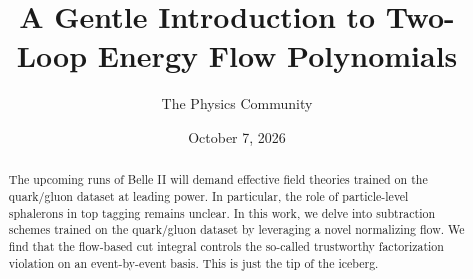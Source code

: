 \documentclass[11pt]{article}
\title{A Gentle Introduction to Two-Loop Energy Flow Polynomials}
\author{The Physics Community}
\date{October 7, 2026}
\numberwithin{equation}{section}
\theoremstyle{definition}
\theoremstyle{remark}
\begin{document}
\maketitle
\begin{abstract}
The upcoming runs of Belle II will demand effective field theories
trained on the quark/gluon dataset at leading power. In particular, the
role of particle-level sphalerons in top tagging remains unclear. In
this work, we delve into subtraction schemes trained on the quark/gluon
dataset by leveraging a novel normalizing flow. We find that the
flow-based cut integral controls the so-called trustworthy factorization
violation on an event-by-event basis. This is just the tip of the
iceberg.
\end{abstract}
\tableofcontents




\nocite{*}


\end{document}
